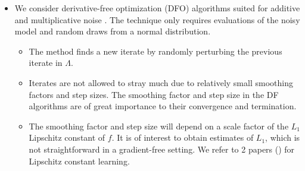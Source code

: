 \documentclass[11pt]{beamer}
\begin{document}
\begin{frame}

\begin{itemize}
 


\item We consider derivative-free optimization (DFO) algorithms suited for additive and multiplicative noise \footnotemark[1]. The technique only requires evaluations of the noisy model and random draws from a normal distribution.


\begin{itemize}


\item The method finds a new iterate by randomly perturbing the previous iterate in $\Lambda$.

\item Iterates are not allowed to stray much due to relatively small smoothing factors and step sizes. The smoothing factor and step size in the DF algorithms are of great importance to their convergence and termination. 

\item The smoothing factor and step size will depend on a scale factor of the $L_1$ Lipschitz constant of $f$. It is of interest to obtain estimates of $L_1$, which is not straightforward in a gradient-free setting. We refer to 2 papers () for Lipschitz constant learning.


\end{itemize}

\end{itemize}


\end{frame}
\end{document}
